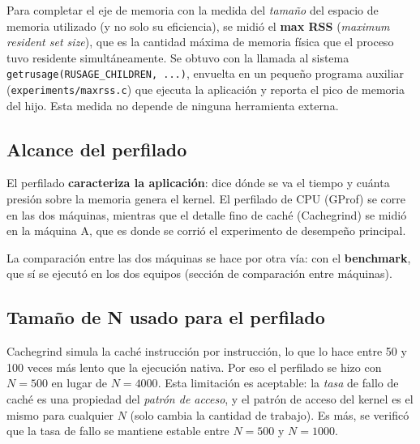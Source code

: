 Para completar el eje de memoria con la medida del \emph{tamaño} del espacio de memoria utilizado (y no solo su eficiencia), se midió el \textbf{max RSS} (\textit{maximum resident set size}), que es la cantidad máxima de memoria física que el proceso tuvo residente simultáneamente. Se obtuvo con la llamada al sistema \texttt{getrusage(RUSAGE\_CHILDREN, ...)}, envuelta en un pequeño programa auxiliar (\texttt{experiments/maxrss.c}) que ejecuta la aplicación y reporta el pico de memoria del hijo. Esta medida no depende de ninguna herramienta externa.

\subsection{Alcance del perfilado}

El perfilado \textbf{caracteriza la aplicación}: dice dónde se va el tiempo y cuánta presión sobre la memoria genera el kernel. El perfilado de CPU (GProf) se corre en las dos máquinas, mientras que el detalle fino de caché (Cachegrind) se midió en la máquina A, que es donde se corrió el experimento de desempeño principal.

La comparación entre las dos máquinas se hace por otra vía: con el \textbf{benchmark}, que sí se ejecutó en los dos equipos (sección de comparación entre máquinas).

\subsection{Tamaño de N usado para el perfilado}

Cachegrind simula la caché instrucción por instrucción, lo que lo hace entre 50 y 100 veces más lento que la ejecución nativa. Por eso el perfilado se hizo con $N = 500$ en lugar de $N = 4000$. Esta limitación es aceptable: la \emph{tasa} de fallo de caché es una propiedad del \emph{patrón de acceso}, y el patrón de acceso del kernel es el mismo para cualquier $N$ (solo cambia la cantidad de trabajo). Es más, se verificó que la tasa de fallo se mantiene estable entre $N = 500$ y $N = 1000$.

